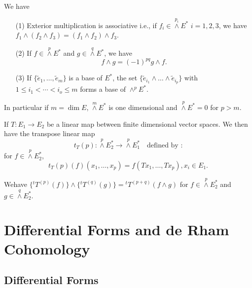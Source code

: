 We have
\begin{prop*}
\begin{itemize}
\item[\rm (1)] Exterior multiplication is associative i.e., if $f_{i}\in {\displaystyle{\mathop{\wedge}\limits^{p_{i}}}}E^{*}$ $i=1,2,3$, we have $f_{1}\wedge(f_{2}\wedge f_{3})=(f_{1}\wedge f_{2})\wedge f_{3}$.

\item[\rm (2)] If $f\in {\displaystyle{\mathop{\wedge}\limits^{p}}}E^{*}$ and $g\in {\displaystyle{\mathop{\wedge}\limits^{q}}}E^{*}$, we have
$$
f\wedge g= (-1)^{pq} g\wedge f.
$$

\item[\rm (3)] If $\{\widetilde{e}_{1},\ldots,\widetilde{e}_{m}\}$ is a base of $E^{*}$, the set $\{\widetilde{e}_{i_{1}}\wedge\ldots\wedge \widetilde{e}_{i_{p}}\}$ with $1\leq i_{1}<\cdots <i_{o}\leq m$ forms a base of ${\displaystyle{\mathop{\wedge}^{p}}}E^{*}$.
\end{itemize}
\end{prop*}

In particular if $m=\dim E$, ${\displaystyle{\mathop{\wedge}\limits^{m}}}E^{*}$ is one dimensional and ${\displaystyle{\mathop{\wedge}\limits^{p}}}E^{*}=0$ for $p>m$.

If $T:E_{1}\to E_{2}$ be a linear map between finite dimensional vector spaces. We then have the transpose linear map
$$
t_{T}(p):{\displaystyle{\mathop{\wedge}\limits^{p}}}E^{*}_{2}\to {\displaystyle{\mathop{\wedge}\limits^{p}}}E^{*}_{1}\quad\text{defined by :}
$$
for $f\in {\displaystyle{\mathop{\wedge}\limits^{p}}}E^{*}_{2}$,
$$
t_{T}(p)(f)(x_{1},\ldots,x_{p})=f(Tx_{1},\ldots,Tx_{p}),x_{i}\in E_{1}.
$$

We\pageoriginale have $\{{}^{t}T^{(p)}(f)\}\wedge \{{}^{t}T^{(q)}(g)\}={}^{t}T^{(p+q)}(f\wedge g)$ for $f\in {\displaystyle{\mathop{\wedge}\limits^{p}}} E^{*}_{2}$ and $g\in {\displaystyle{\mathop{\wedge}\limits^{q}}}E^{*}_{2}$.

\section{Differential Forms and de Rham Cohomology}\label{sec4}

\subsection*{Differential Forms}

